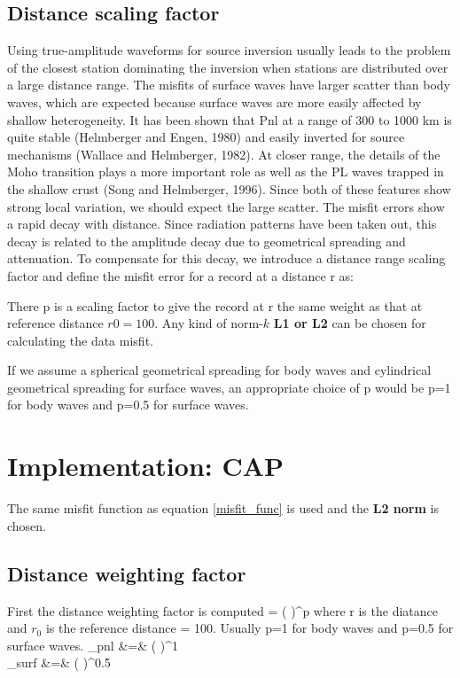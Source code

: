 \documentclass[11pt,titlepage,fleqn]{article}
\begin{document}
\subsection{Distance scaling factor}
Using true-amplitude waveforms for source inversion usually leads to the problem of the closest station dominating the inversion when stations are distributed over a large distance range. The misfits of surface waves have larger scatter than body waves, which are expected because surface waves are more easily affected by shallow heterogeneity. It has been shown that Pnl at a range of 300 to 1000 km is quite stable (Helmberger and Engen, 1980) and easily inverted for source mechanisms (Wallace and Helmberger, 1982). At closer range, the details of the Moho transition plays a more important role as well as the PL waves trapped in the shallow crust (Song and Helmberger, 1996). Since both of these features show strong local variation, we should expect the large scatter.  The misfit errors show a rapid decay with distance. Since radiation patterns have been taken out, this decay is related to the amplitude decay due to geometrical spreading and attenuation. To compensate for this decay, we introduce a distance range scaling factor and define the misfit error for a record at a distance r as:
\eq
{}
\label{misfit_func}
\en

There p is a scaling factor to give the record at r the same weight as that at reference distance $r0=100$. Any kind of norm-$k$ {\bf L1 or L2} can be chosen for calculating the data misfit. 

If we assume a spherical geometrical spreading for body waves and cylindrical geometrical spreading for surface waves, an appropriate choice of p would be p=1 for body waves and p=0.5 for surface waves.

\section{Implementation: CAP}
The same misfit function as equation \ref{misfit_func} is used and the {\bf L2 norm} is chosen.
\subsection{Distance weighting factor}
First the distance weighting factor is computed
\eq
\mu = \left(  \right)^p
\en
where r is the diatance and $r_0$ is the reference distance = 100. Usually p=1 for body waves and p=0.5 for surface waves.
\eqa
\mu_{pnl} &=& \left(  \right)^1\\
\mu_{surf} &=& \left(  \right)^{0.5}
\ena
\end{document}
